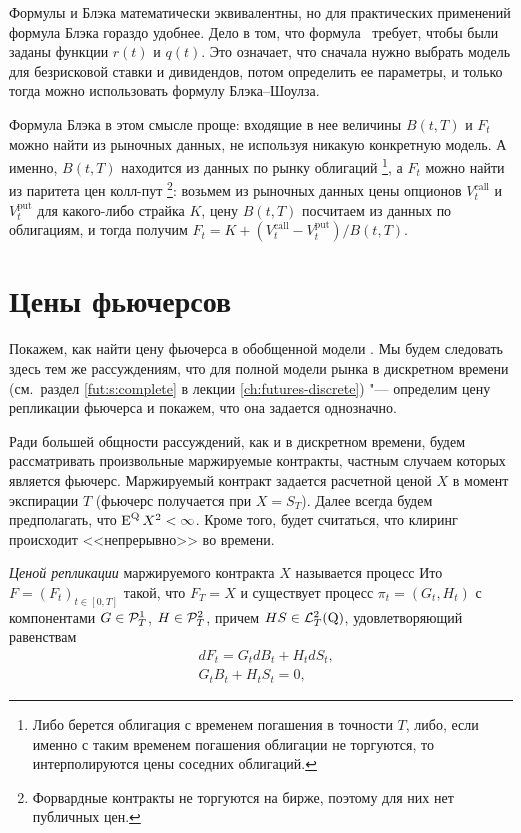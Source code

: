 \begin{remark}
Формулы \bs и Блэка математически эквивалентны, но для практических применений формула Блэка гораздо удобнее.
Дело в том, что формула \bs\ требует, чтобы были заданы функции $r(t)$ и $q(t)$.
Это означает, что сначала нужно выбрать модель для безрисковой ставки и дивидендов, потом определить ее параметры, и только тогда можно использовать формулу Блэка--Шоулза.

Формула Блэка в этом смысле проще: входящие в нее величины $B(t,T)$ и $F_t$ можно найти из рыночных данных, не используя никакую конкретную модель.
А именно, $B(t,T)$ находится из данных по рынку облигаций%
\footnote{Либо берется облигация с временем погашения в точности $T$, либо, если именно с таким временем погашения облигации не торгуются, то интерполируются цены соседних облигаций.},
а $F_t$ можно найти из паритета цен колл-пут%
\footnote{Форвардные контракты не торгуются на бирже, поэтому для них нет публичных цен.}:
возьмем из рыночных данных цены опционов $V_t^\text{call}$ и $V_t^\text{put}$ для какого-либо страйка $K$, цену $B(t,T)$ посчитаем из данных по облигациям, и тогда получим $F_t = K + (V_t^\text{call} - V_t^\text{put})/B(t,T)$.
\end{remark}


\section{Цены фьючерсов}
\label{bs2:ss:futures}

Покажем, как найти цену фьючерса в обобщенной модели \bs.
Мы будем следовать здесь тем же рассуждениям, что для полной модели рынка в дискретном времени (см.\ раздел \ref{fut:s:complete} в лекции \ref{ch:futures-discrete}) "--- определим цену репликации фьючерса и покажем, что она задается однозначно.

Ради большей общности рассуждений, как и в дискретном времени, будем рассматривать произвольные маржируемые контракты, частным случаем которых является фьючерс.
Маржируемый контракт задается расчетной ценой $X$ в момент экспирации $T$ (фьючерс получается при $X=S_T$).
Далее всегда будем предполагать, что $\operatorname{E}^{\mathrm{Q}} X^2 < \infty$.
Кроме того, будет считаться, что клиринг происходит <<непрерывно>> во времени.

\begin{definition}
\label{bs2:d:fut-price}
\emph{Ценой репликации} маржируемого контракта $X$ называется процесс Ито $F=(F_t)_{t\in[0,T]}$ такой, что $F_T=X$ и существует процесс $\pi_t=(G_t,H_t)$ с компонентами $G\in\mathcal{P}^1_T$, $H\in\mathcal{P}^2_T$, причем $HS\in\mathcal{L}_T^2(\mathrm{Q})$, удовлетворяющий равенствам
\begin{align}
\label{bs2:fut-df}
&dF_t = G_t dB_t + H_tdS_t,\\
\label{bs2:fut-v}
&G_tB_t + H_tS_t = 0,
\end{align}
\end{definition}

